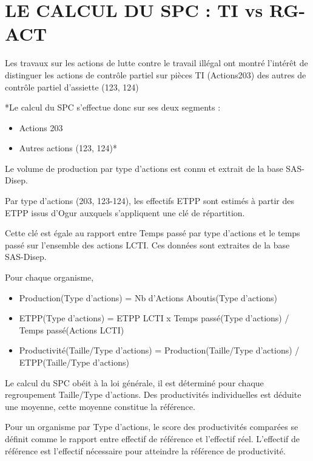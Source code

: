 \documentclass[
]{book}
\providecommand{\tightlist}{%
  \setlength{\itemsep}{0pt}\setlength{\parskip}{0pt}}
\begin{document}
\hypertarget{le-calcul-du-spc-ti-vs-rg-act}{%
\section{LE CALCUL DU SPC : TI vs RG-ACT}\label{le-calcul-du-spc-ti-vs-rg-act}}

Les travaux sur les actions de lutte contre le travail illégal ont montré l'intérêt de distinguer les actions de contrôle partiel sur pièces TI (Actions203) des autres de contrôle partiel d'assiette (123, 124)

*Le calcul du SPC s'effectue donc sur ses deux segments :

\begin{itemize}
\tightlist
\item
  Actions 203
\item
  Autres actions (123, 124)*
\end{itemize}

Le volume de production par type d'actions est connu et extrait de la base SAS-Disep.

Par type d'actions (203, 123-124), les effectifs ETPP sont estimés à partir des ETPP issus d'Ogur auxquels s'appliquent une clé de répartition.

Cette clé est égale au rapport entre Temps passé par type d'actions et le temps passé sur l'ensemble des actions LCTI. Ces données sont extraites de la base SAS-Disep.

Pour chaque organisme,

\begin{itemize}
\item
  Production(Type d'actions) = Nb d'Actions Aboutis(Type d'actions)
\item
  ETPP(Type d'actions) = ETPP LCTI x Temps passé(Type d'actions) / Temps passé(Actions LCTI)
\item
  Productivité(Taille/Type d'actions) = Production(Taille/Type d'actions) / ETPP(Taille/Type d'actions)
\end{itemize}

Le calcul du SPC obéit à la loi générale, il est déterminé pour chaque regroupement Taille/Type d'actions. Des productivités individuelles est déduite une moyenne, cette moyenne constitue la référence.

Pour un organisme par Type d'actions, le score des productivités comparées se définit comme le rapport entre effectif de référence et l'effectif réel. L'effectif de référence est l'effectif nécessaire pour atteindre la référence de productivité.
\end{document}
